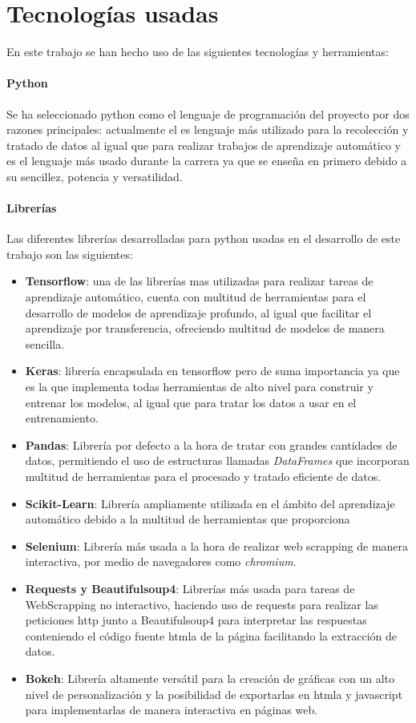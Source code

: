 \section{Tecnologías usadas}
En este trabajo se han hecho uso de las siguientes tecnologías y herramientas:

\paragraph{Python} Se ha seleccionado python como el lenguaje de programación
del proyecto por dos razones principales: actualmente el es lenguaje más
utilizado para la recolección y tratado de datos al igual que para realizar
trabajos de aprendizaje automático \cite{zhao2017web, EmeritusPythonDataScience,
CourseReportPythonDataScience} y es el lenguaje más usado durante la carrera ya
que se enseña en primero debido a su sencillez, potencia y versatilidad.

\paragraph{Librerías} Las diferentes librerías desarrolladas para python usadas
en el desarrollo de este trabajo son las siguientes:
\begin{itemize}
	\item \textbf{Tensorflow}: una de las librerías mas utilizadas para realizar tareas
	de aprendizaje automático, cuenta con multitud de herramientas para el
	desarrollo de modelos de aprendizaje profundo, al igual que facilitar el aprendizaje por transferencia, ofreciendo multitud de modelos de manera sencilla. 
	\item \textbf{Keras}: librería encapsulada en tensorflow pero de suma importancia ya
	que es la que implementa todas herramientas de alto nivel para construir y
	entrenar los modelos, al igual que para tratar los datos a usar en el entrenamiento.
	\item \textbf{Pandas}: Librería por defecto a la hora de tratar con grandes
	cantidades de datos, permitiendo el uso de estructuras llamadas
	\textit{DataFrames} que incorporan multitud de herramientas para el
	procesado y tratado eficiente de datos. 
	\item \textbf{Scikit-Learn}: Librería ampliamente utilizada en el ámbito del aprendizaje automático debido a la multitud de herramientas que proporciona 
	\item \textbf{Selenium}: Librería más usada a la hora de realizar web scrapping de
	manera interactiva, por medio de navegadores como \textit{chromium}.
	\item \textbf{Requests y Beautifulsoup4}: Librerías más usada para tareas de
	WebScrapping no interactivo, haciendo uso de requests para realizar las
	peticiones http junto a Beautifulsoup4 para interpretar las respuestas
	conteniendo el código fuente \gls{htmla} de la página facilitando la extracción de
	datos.
	\item \textbf{Bokeh}: Librería altamente versátil para la creación de gráficas con
	un alto nivel de personalización y la posibilidad de exportarlas en \gls{htmla} y
	javascript para implementarlas de manera interactiva en páginas web.
\end{itemize}  


